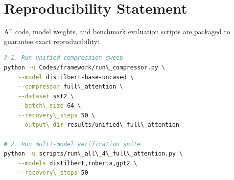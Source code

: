 \section{Reproducibility Statement}
All code, model weights, and benchmark evaluation scripts are packaged to guarantee exact reproducibility:
\begin{lstlisting}[language=bash]
# 1. Run unified compression sweep
python -u Codes/framework/run\_compressor.py \
    --model distilbert-base-uncased \
    --compressor full\_attention \
    --dataset sst2 \
    --batch\_size 64 \
    --recovery\_steps 50 \
    --output\_dir results/unified\_full\_attention

# 2. Run multi-model verification suite
python -u scripts/run\_all\_4\_full\_attention.py \
    --models distilbert,roberta,gpt2 \
    --recovery\_steps 50
\end{lstlisting}
